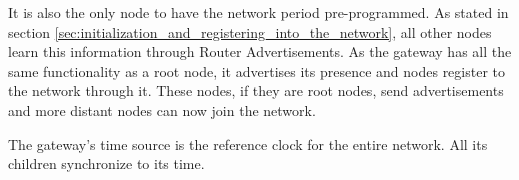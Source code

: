 It is also the only node to have the network period pre-programmed. As stated
in section \ref{sec:initialization_and_registering_into_the_network}, all other
nodes learn this information through Router Advertisements. As the gateway has
all the same functionality as a root node, it advertises its presence and nodes
register to the network through it. These nodes, if they are root nodes, send
advertisements and more distant nodes can now join the network.

The gateway's time source is the reference clock for the entire network. All
its children synchronize to its time. 

